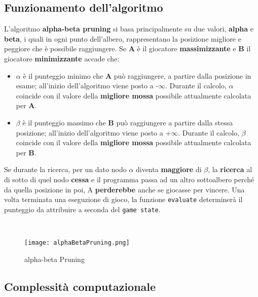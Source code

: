 \documentclass{article}
\begin{document}
    \subsection{Funzionamento dell'algoritmo}
    L'algoritmo \textbf{alpha-beta pruning} si basa principalmente su due valori, \textbf{alpha} e \textbf{beta}, i quali in ogni punto dell'albero, rappresentano la posizione migliore e peggiore che è possibile raggiungere. Se \textbf{A} è il giocatore \textbf{massimizzante} e \textbf{B} il giocatore \textbf{minimizzante} accade che:
    \begin{itemize}
        \item $\alpha$ è il punteggio minimo che \textbf{A} può raggiungere, a partire dalla posizione in esame; all'inizio dell'algoritmo viene posto a -$\infty$. Durante il calcolo, $\alpha$ coincide con il valore della \textbf{migliore mossa} possibile attualmente calcolata per \textbf{A}.
        \item $\beta$ è il punteggio massimo che \textbf{B} può raggiungere a partire dalla stessa posizione; all'inizio dell'algoritmo viene posto a +$\infty$. Durante il calcolo, $\beta$ coincide con il valore della \textbf{migliore mossa} possibile attualmente calcolata per \textbf{B}.
    \end{itemize}
    
    Se durante la ricerca, per un dato nodo $\alpha$ diventa \textbf{maggiore} di $\beta$, la \textbf{ricerca} al di sotto di quel nodo \textbf{cessa} e il programma passa ad un altro sottoalbero perché da quella posizione in poi, A \textbf{perderebbe} anche se giocasse per vincere. \citep{alpha-beta-pruning}
    Una volta terminata una eseguzione di gioco, la funzione \texttt{evaluate} determinerà il punteggio da attribuire a seconda del \texttt{game state}.
   
    \\
    \begin{figure}[h!]
    \centering
    \texttt{[image: alphaBetaPruning.png]}
    \caption{alpha-beta Pruning}
    \label{fig:universe}
    \end{figure}
    
    \newpage
    \subsection{Complessità computazionale}
    
\end{document}

